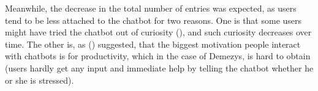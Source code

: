 Meanwhile, the decrease in the total number of entries was expected, as users tend to be less attached to the chatbot for two reasons. One is that some users might have tried the chatbot out of curiosity (\cite{47_curiosity}), and such curiosity decreases over time. The other is, as \citeauthor{48_why_chatbot} (\citeyear{48_why_chatbot}) suggested, that the biggest motivation people interact with chatbots is for productivity, which in the case of Demezys, is hard to obtain (users hardly get any input and immediate help by telling the chatbot whether he or she is stressed).
